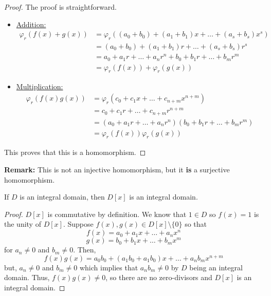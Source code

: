 \documentclass[letterpaper]{article}
\begin{document}
\begin{mdframed}[]
    \begin{proof}
        The proof is straightforward. 
        \begin{itemize}
            \item \underline{Addition:}
            \begin{equation*}
                \begin{aligned}
                    \varphi_{r}(f(x) + g(x)) &= \varphi_{r}((a_0 + b_0) + (a_1 + b_1)x + \dots + (a_s + b_s)x^s) \\ 
                        &= (a_0 + b_0) + (a_1 + b_1) r + \dots + (a_s + b_s) r^s \\ 
                        &= a_0 + a_1 r + \dots + a_n r^n + b_0 + b_1 r + \dots + b_m r^m \\ 
                        &= \varphi_{r}(f(x)) + \varphi_{r}(g(x))
                \end{aligned}
            \end{equation*}

            \item \underline{Multiplication:}
            \begin{equation*}
                \begin{aligned}
                    \varphi_{r}(f(x) g(x)) &= \varphi_{r}(c_0 + c_1 x + \dots + c_{n + m} x^{n + m}) \\ 
                        &= c_0 + c_1 r + \dots + c_{n + m} r^{n + m} \\ 
                        &= (a_0 + a_1 r + \dots + a_n r^n)(b_0 + b_1 r + \dots + b_m r^m) \\ 
                        &= \varphi_{r}(f(x)) \varphi_{r}(g(x))
                \end{aligned}
            \end{equation*}
        \end{itemize}
        This proves that this is a homomorphism. 
    \end{proof}
\end{mdframed}

\textbf{Remark:} This is not an injective homomorphism, but it \textbf{is} a surjective homomorphism.

\begin{theorem}{}{}
    If $D$ is an integral domain, then $D[x]$ is an integral domain. 
\end{theorem}

\begin{mdframed}[]
    \begin{proof}
        $D[x]$ is commutative by definition. We know that $1 \in D$ so $f(x) = 1$ is the unity of $D[x]$. Suppose $f(x), g(x) \in D[x] \setminus \{0\}$ so that 
        \[f(x) = a_0 + a_1 x + \dots + a_n x^n\]
        \[g(x) = b_0 + b_1 x + \dots + b_m x^m\]
        for $a_n \neq 0$ and $b_m \neq 0$. Then,
        \[f(x) g(x) = a_0 b_0 + (a_1 b_0 + a_1 b_0) x + \dots + a_n b_m x^{n + m}\]
        but, $a_n \neq 0$ and $b_m \neq 0$ which implies that $a_n b_m \neq 0$ by $D$ being an integral domain. Thus, $f(x) g(x) \neq 0$, so there are no zero-divisors and $D[x]$ is an integral domain. 
    \end{proof}
\end{mdframed}
\end{document}
